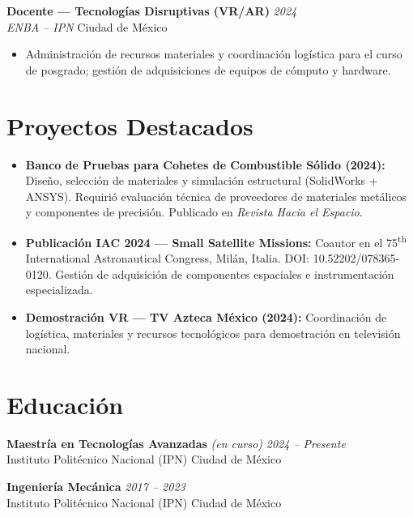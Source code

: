 \documentclass[11pt, a4paper]{article}
\begin{document}
\vspace{4pt}
\textbf{Docente --- Tecnolog\'ias Disruptivas (VR/AR)} \hfill \textit{2024}\\
\textit{ENBA -- IPN} \hfill Ciudad de M\'exico
\begin{itemize}[leftmargin=*, itemsep=2pt]
    \item Administraci\'on de recursos materiales y coordinaci\'on log\'istica para el
          curso de posgrado; gesti\'on de adquisiciones de equipos de c\'omputo y hardware.
\end{itemize}

\section{Proyectos Destacados}
\begin{itemize}[leftmargin=*, itemsep=3pt]
    \item \textbf{Banco de Pruebas para Cohetes de Combustible S\'olido (2024):}
          Dise\~no, selecci\'on de materiales y simulaci\'on estructural (SolidWorks + ANSYS).
          Requiri\'o evaluaci\'on t\'ecnica de proveedores de materiales met\'alicos y
          componentes de precisi\'on. Publicado en \textit{Revista Hacia el Espacio}.
    \item \textbf{Publicaci\'on IAC 2024 --- Small Satellite Missions:}
          Coautor en el 75\textsuperscript{th} International Astronautical Congress,
          Mil\'an, Italia. DOI: 10.52202/078365-0120. Gesti\'on de adquisici\'on de
          componentes espaciales e instrumentaci\'on especializada.
    \item \textbf{Demostraci\'on VR --- TV Azteca M\'exico (2024):}
          Coordinaci\'on de log\'istica, materiales y recursos tecnol\'ogicos para
          demostraci\'on en televisi\'on nacional.
\end{itemize}

\section{Educaci\'on}

\textbf{Maestr\'ia en Tecnolog\'ias Avanzadas} \textit{(en curso)} \hfill \textit{2024 -- Presente}\\
Instituto Polit\'ecnico Nacional (IPN) \hfill Ciudad de M\'exico

\vspace{4pt}
\textbf{Ingenier\'ia Mec\'anica} \hfill \textit{2017 -- 2023}\\
Instituto Polit\'ecnico Nacional (IPN) \hfill Ciudad de M\'exico
\end{document}
